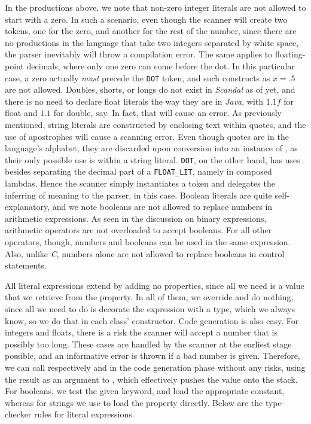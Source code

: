 In the productions above, we note that non-zero integer literals are not allowed to start with a zero. In such a scenario, even though the scanner will create two tokens, one for the zero, and another for the rest of the number, since there are no productions in the language that take two integers separated by white space, the parser inevitably will throw a compilation error. The same applies to floating-point decimals, where only one zero can come before the dot. In this particular case, a zero actually \emph{must} precede the \texttt{DOT} token, and such constructs as $x = .5$ are not allowed. Doubles, shorts, or longs do not exist in \emph{Scandal} as of yet, and there is no need to declare float literals the way they are in \emph{Java}, with $1.1f$ for float and $1.1$ for double, say. In fact, that will cause an error. As previously mentioned, string literals are constructed by enclosing text within quotes, and the use of apostrophes will cause a scanning error. Even though quotes are in the language's alphabet, they are discarded upon conversion into an instance of , as their only possible use is within a string literal. \texttt{DOT}, on the other hand, has uses besides separating the decimal part of a \texttt{FLOAT\_LIT}, namely in composed lambdas. Hence the scanner simply instantiates a token and delegates the inferring of meaning to the parser, in this case. Boolean literals are quite self-explanatory, and we note booleans are not allowed to replace numbers in arithmetic expressions. As seen in the discussion on binary expressions, arithmetic operators are not overloaded to accept booleans. For all other operators, though, numbers and booleans can be used in the same expression. Also, unlike \emph{C}, numbers alone are not allowed to replace booleans in control statements.

All literal expressions extend  by adding no properties, since all we need is a value that we retrieve from the  property. In all of them, we override  and do nothing, since all we need to do is decorate the expression with a type, which we always know, so we do that in each class' constructor. Code generation is also easy. For integers and floats, there is a risk the scanner will accept a number that is possibly too long. These cases are handled by the scanner at the earliest stage possible, and an informative error is thrown if a bad number is given. Therefore, we can call respectively  and  in the code generation phase without any risks, using the result as an argument to , which effectively pushes the value onto the stack. For booleans, we test the given keyword, and load the appropriate constant, whereas for strings we use  to load the  property directly. Below are the type-checker rules for literal expressions.

